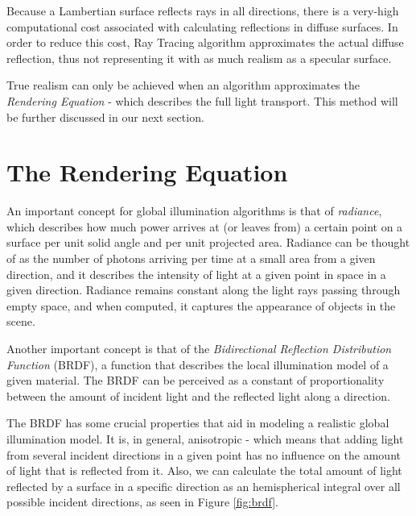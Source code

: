 
Because a Lambertian surface reflects rays in all directions, there is a very-high computational cost associated with calculating reflections in diffuse surfaces. In order to reduce this cost, Ray Tracing algorithm approximates the actual diffuse reflection, thus not representing it with as much realism as a specular surface.

True realism can only be achieved when an algorithm approximates the \textit{Rendering Equation}  - which describes the full light transport.
This method will be further discussed in our next section. 

\section{The Rendering Equation}

An important concept for global illumination algorithms is that of \textit{radiance}, which describes how much power arrives at (or leaves from) a certain point on a surface per unit solid angle and per unit projected area. Radiance can be thought of as the number of photons arriving per time at a small area from a given direction, and it describes the intensity of light at a given point in space in a given direction. Radiance remains constant along the light rays passing through empty space, and when computed, it captures the appearance of objects in the scene.

Another important concept is that of the \textit{Bidirectional Reflection Distribution Function} (BRDF), a function that describes the local illumination model of a given material. The BRDF can be perceived as a constant of proportionality between the amount of incident light and the reflected light along a direction. 

The BRDF has some crucial properties that aid in modeling a realistic global illumination model. It is, in general, anisotropic - which means that adding light from several incident directions in a given point has no influence on the amount of light that is reflected from it. Also, we can calculate the total amount of light reflected by a surface in a specific direction as an hemispherical integral over all possible incident directions, as seen in Figure \ref{fig:brdf}.

